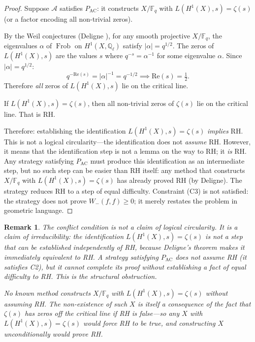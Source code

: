 \documentclass[12pt]{article}
\newtheorem{remark}[theorem]{Remark}
\DeclareMathOperator{\Frob}{Frob}
\newcommand{\FF}{\mathbb{F}}
\newcommand{\Ql}{\mathbb{Q}_\ell}
\newcommand{\PAC}{P_{\mathrm{AC}}}
\begin{document}
\begin{proof}
Suppose $\mathcal{A}$ satisfies $\PAC$: it constructs $X/\FF_q$ with
$L(H^1(X), s) = \zeta(s)$ (or a factor encoding all non-trivial zeros).

By the Weil conjectures (Deligne \cite{deligne1974}), for any smooth
projective $X/\FF_q$, the eigenvalues $\alpha$ of $\Frob$ on
$H^1(X, \Ql)$ satisfy $|\alpha| = q^{1/2}$. The zeros of
$L(H^1(X), s)$ are the values $s$ where $q^{-s} = \alpha^{-1}$ for
some eigenvalue $\alpha$. Since $|\alpha| = q^{1/2}$:
\[
q^{-\mathrm{Re}(s)} = |\alpha|^{-1} = q^{-1/2}
\implies \mathrm{Re}(s) = \tfrac{1}{2}.
\]
Therefore \emph{all} zeros of $L(H^1(X), s)$ lie on the critical line.

If $L(H^1(X), s) = \zeta(s)$, then all non-trivial zeros of $\zeta(s)$
lie on the critical line. That is RH.

Therefore: establishing the identification $L(H^1(X), s) = \zeta(s)$
\emph{implies} RH. This is not a logical circularity---the identification
does not \emph{assume} RH. However, it means that the identification
step is not a lemma on the way to RH; it \emph{is} RH. Any strategy
satisfying $\PAC$ must produce this identification as an intermediate
step, but no such step can be easier than RH itself: any method that
constructs $X/\FF_q$ with $L(H^1(X),s) = \zeta(s)$ has already proved
RH (by Deligne). The strategy reduces RH to a step of equal difficulty.
Constraint (C3) is not satisfied: the strategy does not prove
$W_-(f,f) \geq 0$; it merely restates the problem in geometric language.
\end{proof}

\begin{remark}
\label{rem:conflict-clarification}
The conflict condition is not a claim of logical circularity. It is a
claim of \emph{irreducibility}: the identification $L(H^1(X),s) =
\zeta(s)$ is not a step that can be established independently of RH,
because Deligne's theorem makes it immediately equivalent to RH. A
strategy satisfying $\PAC$ does not assume RH (it satisfies C2), but
it cannot complete its proof without establishing a fact of equal
difficulty to RH. This is the structural obstruction.

No known method constructs $X/\FF_q$ with $L(H^1(X),s) = \zeta(s)$
without assuming RH. The non-existence of such $X$ is itself a
consequence of the fact that $\zeta(s)$ has zeros off the critical
line if RH is false---so any $X$ with $L(H^1(X),s) = \zeta(s)$ would
force RH to be true, and constructing $X$ unconditionally would prove RH.
\end{remark}
\end{document}
